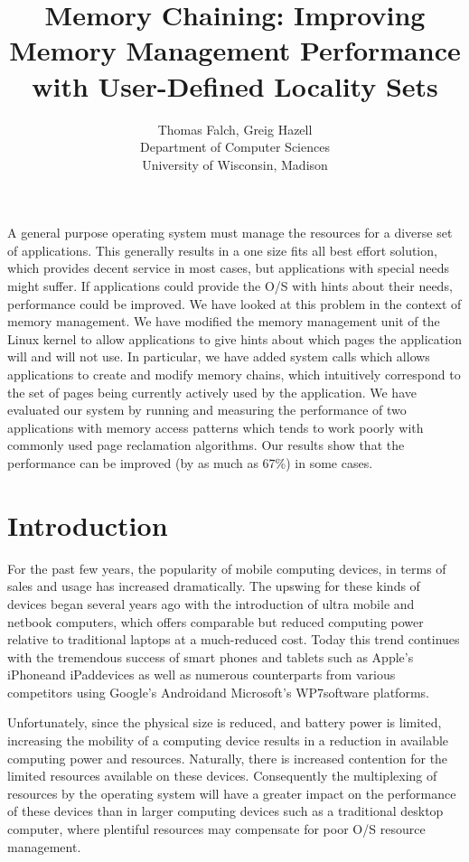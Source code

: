 \documentclass[10pt,a4paper,twocolumn]{article}
\author{Thomas Falch, Greig Hazell \\ Department of Computer Sciences \\ University of Wisconsin, Madison}
\title{Memory Chaining: Improving Memory Management Performance with User-Defined Locality Sets}
\begin{document}
\maketitle
\begin{onecolabstract}
A general purpose operating system must manage the resources for a diverse set of applications. This
generally results in a one size fits all best effort solution, which provides decent service in most
cases, but applications with special needs might suffer. If applications could provide the O/S with
hints about their needs, performance could be improved. We have looked at this problem in the
context of memory management. We have modified the memory management unit of the Linux kernel to
allow applications to give hints about which pages the application will and will not use. In
particular, we have added system calls which allows applications to create and modify memory chains,
which intuitively correspond to the set of pages being currently actively used by the application.
We have evaluated our system by running and measuring the performance of two applications with
memory access patterns which tends to work poorly with commonly used page reclamation algorithms.
Our results show that the performance can be improved (by as much as 67\%) in some cases.
\end{onecolabstract}

\section{Introduction}
For the past few years, the popularity of mobile computing devices, in terms of sales and usage has
increased dramatically.  The upswing for these kinds of devices began several years ago with the
introduction of ultra mobile and netbook computers, which offers comparable but reduced computing
power relative to traditional laptops at a much-reduced cost. Today this trend continues with the
tremendous success of smart phones and tablets such as Apple's iPhone\texttrademark and
iPad\texttrademark devices as well as numerous counterparts from various competitors using Google's
Android\texttrademark and Microsoft's WP7\texttrademark software platforms.

Unfortunately, since the physical size is reduced, and battery power is limited, increasing the
mobility of a computing device results in a reduction in available computing power and resources.
Naturally, there is increased contention for the limited resources available on these devices.
Consequently the multiplexing of resources by the operating system will have a greater impact on the
performance of these devices than in larger computing devices such as a traditional desktop
computer, where plentiful resources may compensate for poor O/S resource management.
\end{document}
